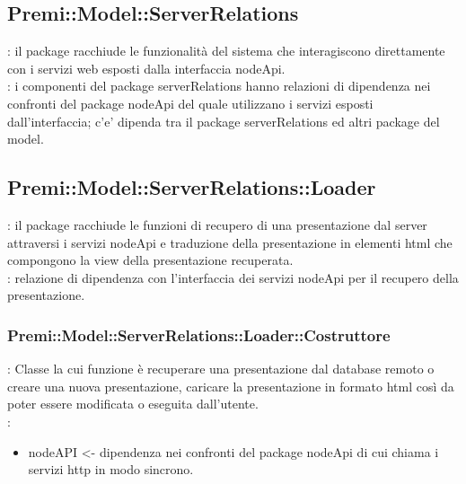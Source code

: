\subsection{Premi::Model::ServerRelations}{
		\textbf{\tipo}: il package racchiude le funzionalità del sistema che interagiscono direttamente con i servizi web esposti dalla interfaccia nodeApi.\\
		\textbf{\relaz}: i componenti del package serverRelations hanno relazioni di dipendenza nei confronti del package nodeApi del quale utilizzano i servizi esposti dall’interfaccia; c’e’ dipenda tra il package serverRelations ed altri package del model.\\
}

\subsection{Premi::Model::ServerRelations::Loader}{
		\textbf{\tipo}: il package racchiude le funzioni di recupero di una presentazione dal server attraversi i servizi nodeApi e traduzione della presentazione in elementi html che compongono la view della presentazione recuperata.\\
		\textbf{\relaz}: relazione di dipendenza con l’interfaccia dei servizi nodeApi per il recupero della presentazione.\\

\subsubsection{Premi::Model::ServerRelations::Loader::Costruttore}{
				\textbf{\tipo}: Classe la cui funzione è recuperare una presentazione dal database remoto o creare una nuova presentazione,  caricare la presentazione in formato html così da poter essere modificata o eseguita dall’utente.\\	
				\textbf{\relaz}: 
				\begin{itemize}
					\item nodeAPI <- dipendenza nei confronti del package nodeApi di cui chiama i servizi http in modo sincrono.
				\end{itemize}	
                    }
}

